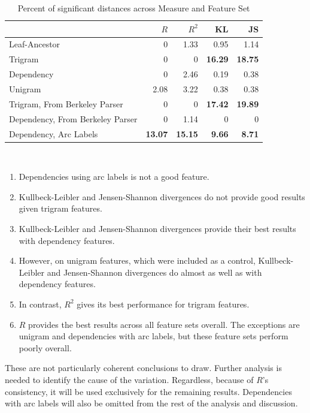 \begin{table}
\begin{tabular}{l|rrrr}
  & $R$ & $R^2$ & KL & JS  \\ \hline
  Leaf-Ancestor                    & 0 & 1.33 & 0.95 & 1.14 \\
  Trigram                            & 0 & 0 & {\bf 16.29} & {\bf 18.75} \\
  Dependency                       & 0 & 2.46 & 0.19 & 0.38 \\
  Unigram                             & 2.08 & 3.22 & 0.38 & 0.38\\
  Trigram, From Berkeley Parser& 0 & 0 & {\bf 17.42} & {\bf 19.89} \\
  Dependency, From Berkeley Parser & 0 & 1.14 & 0 & 0 \\
  Dependency, Arc Labels
  & {\bf 13.07} & {\bf 15.15} & {\bf 9.66} & {\bf 8.71} \\
\end{tabular} \\
\label{significances-percent}
\caption{Percent of significant distances across Measure and Feature
  Set}
\end{table}



\begin{enumerate}
\item Dependencies using arc labels is not a good feature.
\item Kullbeck-Leibler and Jensen-Shannon divergences
do not provide good results given trigram features.
\item Kullbeck-Leibler and Jensen-Shannon divergences provide their
  best results with dependency features.
\item However, on unigram features, which were included as a control,
  Kullbeck-Leibler and Jensen-Shannon divergences do almost as well as with
  dependency features.
\item In contrast, $R^2$ gives its best performance for trigram
  features.
\item $R$ provides the best results across all feature sets
  overall. The exceptions are unigram and dependencies with arc
  labels, but these feature sets perform poorly overall.
\end{enumerate}

These are not particularly coherent conclusions to draw. Further
analysis is needed to identify the cause of the variation. Regardless,
because of $R$'s consistency, it will be used exclusively for the
remaining results. Dependencies with arc labels will also be omitted
from the rest of the analysis and discussion.

